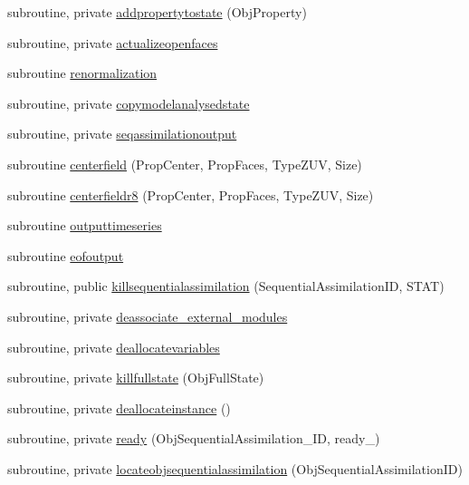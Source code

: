\begin{DoxyCompactItemize}
\item 
subroutine, private \mbox{\hyperlink{namespacemodulesequentialassimilation_a5cad8b44cf828f7b0f86fffd43e9f8a7}{addpropertytostate}} (Obj\+Property)
\item 
subroutine, private \mbox{\hyperlink{namespacemodulesequentialassimilation_ad6321e8248e2b795443ddc551cbc9446}{actualizeopenfaces}}
\item 
subroutine \mbox{\hyperlink{namespacemodulesequentialassimilation_a5ba1ccc67425087e399ba6f24403f98e}{renormalization}}
\item 
subroutine, private \mbox{\hyperlink{namespacemodulesequentialassimilation_adcd2e5938f9991a133ebe1cf7eb7ad2f}{copymodelanalysedstate}}
\item 
subroutine, private \mbox{\hyperlink{namespacemodulesequentialassimilation_a80cfe86b207ec25cc26de13d8bad205c}{seqassimilationoutput}}
\item 
subroutine \mbox{\hyperlink{namespacemodulesequentialassimilation_a2481d2ea20d9e305e0090e324dd3893e}{centerfield}} (Prop\+Center, Prop\+Faces, Type\+Z\+UV, Size)
\item 
subroutine \mbox{\hyperlink{namespacemodulesequentialassimilation_aa1246853229add1c591a38826af67ea2}{centerfieldr8}} (Prop\+Center, Prop\+Faces, Type\+Z\+UV, Size)
\item 
subroutine \mbox{\hyperlink{namespacemodulesequentialassimilation_a484eaebcabbe127119b8f5623e94c654}{outputtimeseries}}
\item 
subroutine \mbox{\hyperlink{namespacemodulesequentialassimilation_a4f7834d6d8d5c26c37c74e758a14b521}{eofoutput}}
\item 
subroutine, public \mbox{\hyperlink{namespacemodulesequentialassimilation_a50ed5db30b7f431f2b333f7f86d5ef99}{killsequentialassimilation}} (Sequential\+Assimilation\+ID, S\+T\+AT)
\item 
subroutine, private \mbox{\hyperlink{namespacemodulesequentialassimilation_adf87f0a5e3f8680e6eab41ee6c53dd51}{deassociate\+\_\+external\+\_\+modules}}
\item 
subroutine, private \mbox{\hyperlink{namespacemodulesequentialassimilation_aa604c23d9d9ee0bb814f499c565fde3f}{deallocatevariables}}
\item 
subroutine, private \mbox{\hyperlink{namespacemodulesequentialassimilation_a7077ed60ddc61ad6d71f0df6d63bd587}{killfullstate}} (Obj\+Full\+State)
\item 
subroutine, private \mbox{\hyperlink{namespacemodulesequentialassimilation_a3d80f83cfeb707312981be037f194082}{deallocateinstance}} ()
\item 
subroutine, private \mbox{\hyperlink{namespacemodulesequentialassimilation_a612c7f8e7d5560ffd80850c43f9e9c35}{ready}} (Obj\+Sequential\+Assimilation\+\_\+\+ID, ready\+\_\+)
\item 
subroutine, private \mbox{\hyperlink{namespacemodulesequentialassimilation_a1d6ec9ce245a5aa2d80e8f35b8142e21}{locateobjsequentialassimilation}} (Obj\+Sequential\+Assimilation\+ID)
\end{DoxyCompactItemize}
